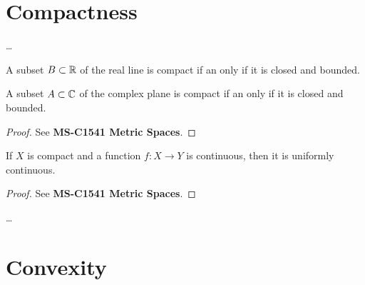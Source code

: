 \section{Compactness}

\begin{definition}[Compactness]
  \label{def:compact}
  \ldots
\end{definition}

\begin{theorem}
  \label{thm:bolzano_weierstrass}
  A subset $B \subset \mathbb{R}$ of the real line is compact
  if an only if it is closed and bounded.

  A subset $A \subset \mathbb{C}$ of the complex plane is compact
  if an only if it is closed and bounded.
\end{theorem}
\begin{proof}
  See \textbf{MS-C1541 Metric Spaces}.
\end{proof}

\begin{lemma}
  \label{lem:on_compact_continuous_implies_uniformly_continuous}
  If $X$ is compact and a function $f \colon X \to Y$ is continuous, then it is uniformly continuous.
\end{lemma}
\begin{proof}
  See \textbf{MS-C1541 Metric Spaces}.
\end{proof}

\begin{theorem}
  \label{thm:intersect_nested_compacts}
  \ldots
\end{theorem}

\section{Convexity}
